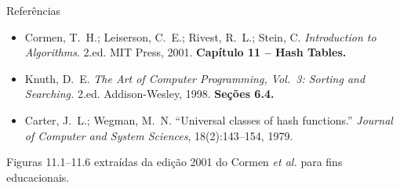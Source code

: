 \documentclass[aspectratio=169]{beamer}
\begin{document}
\begin{frame}{Referências}
\begin{itemize}
\item Cormen, T.\ H.; Leiserson, C.\ E.; Rivest, R.\ L.; Stein, C. \emph{Introduction to Algorithms}. 2.ed. MIT Press, 2001. \textbf{Capítulo 11 -- Hash Tables.}
\item Knuth, D.\ E. \emph{The Art of Computer Programming, Vol.\ 3: Sorting and Searching.} 2.ed. Addison-Wesley, 1998. \textbf{Seções 6.4.}
\item Carter, J.\ L.; Wegman, M.\ N. ``Universal classes of hash functions.'' \emph{Journal of Computer and System Sciences}, 18(2):143--154, 1979.
\end{itemize}
\vfill
{\scriptsize Figuras 11.1--11.6 extraídas da edição 2001 do Cormen \emph{et al.} para fins educacionais.}
\end{frame}
\end{document}
